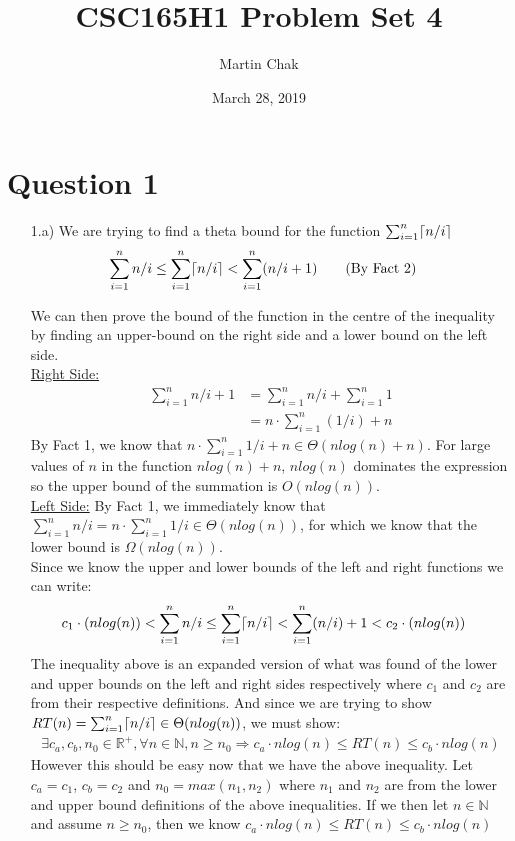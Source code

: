\documentclass[20pt]{article}
\title{CSC165H1 Problem Set 4}
\author{Martin Chak}
\date{March 28, 2019}
\DeclarePairedDelimiter{\ceil}{\lceil}{\rceil}
\begin{document}
\maketitle
\newpage
\section*{Question 1}
\begin{enumerate}
    \item[1.a)] We are trying to find a theta bound for the function $\sum_{i = 1}^{n}\ceil{n/i}$
    \begin{align}
        \sum_{i = 1}^{n}n/i &\leq \sum_{i = 1}^{n}\ceil{n/i} < \sum_{i = 1}^{n}(n/i + 1) \tag{By Fact 2}
    \end{align}
    
    We can then prove the bound of the function in the centre of the inequality by finding an upper-bound on the right side and a lower bound on the left side.\\
    \underline{Right Side:}
    \begin{align}
        \sum_{i = 1}^{n}n/i + 1 &= \sum_{i = 1}^{n}n/i + \sum_{i = 1}^{n}1\nonumber\\
        &= n\cdot\sum_{i = 1}^{n}(1/i) + n\nonumber
    \end{align}
    By Fact 1, we know that $n\cdot\sum_{i = 1}^{n}1/i + n \in \Theta(nlog(n) + n)$. For large values of $n$ in the function $nlog(n) + n$, $nlog(n)$ dominates the expression so the upper bound of the summation is $O(nlog(n))$.\\
    
    \underline{Left Side:}
    By Fact 1, we immediately know that $\sum_{i = 1}^{n}n/i = n\cdot\sum_{i = 1}^{n}1/i\in \Theta(nlog(n))$, for which we know that the lower bound is $\Omega(nlog(n))$.\\
    
    Since we know the upper and lower bounds of the left and right functions we can write:
    \begin{align}
        c_1\cdot(nlog(n)) < \sum_{i = 1}^{n}n/i &\leq \sum_{i = 1}^{n}\ceil{n/i} < \sum_{i = 1}^{n}(n/i) + 1 < c_2\cdot(nlog(n)) \nonumber
    \end{align}
    The inequality above is an expanded version of what was found of the lower and upper bounds on the left and right sides respectively where $c_1$ and $c_2$ are from their respective definitions. And since we are trying to show $RT(n) = \sum_{i = 1}^{n}\ceil{n/i}\in\Theta(nlog(n))$, we must show:
    \begin{align}
        \exists c_a, c_b, n_0 \in\mathbb{R^+}, \forall n \in\mathbb{N}, n\geq n_0 \Rightarrow c_a\cdot nlog(n) \leq RT(n) \leq c_b\cdot nlog(n)\nonumber
    \end{align}
    However this should be easy now that we have the above inequality. Let $c_a = c_1$, $c_b = c_2$ and $n_0 = max(n_1, n_2)$ where $n_1$ and $n_2$ are from the lower and upper bound definitions of the above inequalities. If we then let $n\in\mathbb{N}$ and assume $n \geq n_0$, then we know $c_a\cdot nlog(n) \leq RT(n) \leq c_b\cdot nlog(n)$
    

\end{enumerate}
\end{document}
